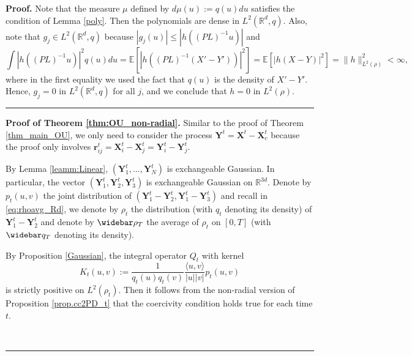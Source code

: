 \documentclass[]{elsarticle}
\def\R{\mathbb{R}}
\def\E{\mathbb{E}}
\newcommand{\wbar}\widebar
\newcommand{\mbf}[1]{\boldsymbol{#1}}
\newcommand{\innerp}[2]{\langle #1,#2 \rangle}
\newcommand{\br}{\mbf{r}}
\newcommand{\bX}{\mbf{X}}
\newcommand{\bY}{\mbf{Y}}
\newenvironment{proof}[1][Proof]{\noindent\textbf{#1.} }{\ \rule{0.5em}{0.5em}}
\numberwithin{equation}{section}
\numberwithin{theorem}{section}
\begin{document}
\begin{proof}
Note that the measure $\mu$ defined by $d\mu(u):=q(u)du$ satisfies the condition of Lemma \ref{poly}. Then the polynomials are dense in $L^2(\mathbb{R}^d,q)$. Also, note that $g_j\in L^2(\mathbb{R}^d,q)$ because $|g_j(u)|\le |h((PL)^{-1}u)|$ and
\[
\int |h((PL)^{-1}u)|^2 q(u)du = \E[|h((PL)^{-1}(X'-Y'))|^2] =  \E[|h(X-Y)|^2]= \|h\|_{L^2(\rho)}^2 < \infty, 
\]
where in the first equality we used the fact that $q(u)$ is the density of $X'-Y'$. Hence, $g_j=0$ in $L^2(\mathbb{R}^d,q)$ for all $j$, and we conclude that $h=0$ in $L^2(\rho)$.
\end{proof}

\bigskip

\begin{proof}[Proof of Theorem \ref{thm:OU_non-radial}] Similar to the proof of Theorem \ref{thm_main_OU}, we only need to consider the process $\bY^t= \bX^t- \bX_c^t$ because the proof only involves $\br_{ij}^t = \bX^{t}_i- \bX^t_j =\bY^{t}_i- \bY^t_j$. 

By Lemma \ref{leamm:Linear}, $(\bY_1^t,\ldots,\bY_N^t)$ is exchangeable Gaussian. In particular, the vector $(\bY^t_1,\bY^t_2,\bY^t_3)$ is exchangeable Gaussian on $\R^{3d}$.   Denote by $p_t(u,v)$ the joint distribution of $(\bY_1^t-\bY_2^t,\bY_1^t-\bY_3^t)$ and recall in \eqref{eq:rhoavg_Rd}, we denote by $\rho_t$ the distribution (with $q_t$ denoting its density) of $\bY_1^t-\bY_2^t$ and denote by $\wbar\rho_T$ the average of $\rho_t$ on $[0,T]$ (with $\wbar q_T$ denoting its density). 

By Proposition \ref{Gaussian}, the integral operator $Q_t$ with  kernel  \begin{equation} \label{kernelK2}
K_t(u,v) := \frac{1}{q_t(u)q_t(v)}\frac{ \innerp{u}{v}}{|u||v|} p_t(u,v)
 \end{equation} is strictly positive on $L^2(\rho_t)$. Then it follows from the non-radial version of Proposition \ref{prop.cc2PD_t} that the coercivity condition holds true for each time $t$. 


\end{proof}
\end{document}
